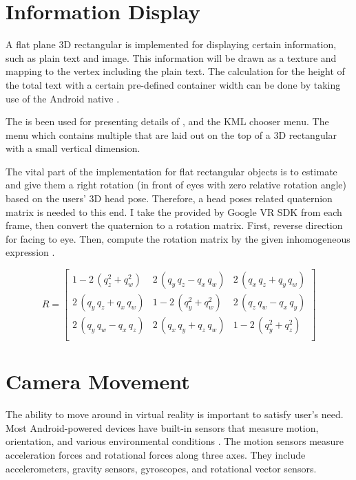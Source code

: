 \section{Information Display}

A flat plane 3D rectangular  is implemented for displaying certain information, such as plain text and image. This information will be drawn as a texture and mapping to the  vertex including the plain text. The calculation for the height of the total text with a certain pre-defined container width can be done by taking use of the Android native . 

The  is been used for presenting details of , and the KML chooser menu. The menu which contains multiple  that are laid out on the top of a 3D rectangular  with a small vertical dimension.

The vital part of the implementation for flat rectangular objects is to estimate and give them a right rotation (in front of eyes with zero relative rotation angle) based on the users' 3D head pose. Therefore, a head poses related quaternion matrix \cite{jvv.quaternions.2013} is needed to this end. I take the   provided by Google VR SDK from each frame, then convert the quaternion to a rotation matrix. First, reverse direction  for facing to eye. Then, compute the rotation matrix by the given inhomogeneous expression \cite{wiki.quaternion-mat.2016}.

\begin{equation}
\label{equ:quaternion-matrix}
R = 
	\begin{bmatrix}
	1 - 2\,(q_z^2 + q_w^2) & 2\,(q_y\,q_z - q_x\,q_w) & 2\,(q_x\,q_z + q_y\,q_w)\\
	2\,(q_y\,q_z + q_x\,q_w) & 1 - 2\,(q_y^2 + q_w^2) & 2\,(q_z\,q_w - q_x\,q_y)\\
	2\,(q_y\,q_w - q_x\,q_z) & 2\,(q_x\,q_y + q_z\,q_w) & 1 - 2\,(q_y^2 + q_z^2)\\
	\end{bmatrix}
\end{equation}

\section{Camera Movement}

The ability to move around in virtual reality is important to satisfy user's need. Most Android-powered devices have built-in sensors that measure motion, orientation, and various environmental conditions \cite{google.sensors.2016}. The motion sensors measure acceleration forces and rotational forces along three axes. They include accelerometers, gravity sensors, gyroscopes, and rotational vector sensors. 

